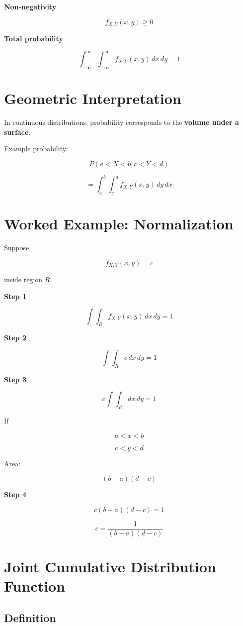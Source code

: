 \documentclass[12pt]{article}
\begin{document}
\textbf{Non-negativity}

\[
f_{X,Y}(x,y) \ge 0
\]

\textbf{Total probability}

\[
\int_{-\infty}^{\infty}\int_{-\infty}^{\infty} f_{X,Y}(x,y)\,dx\,dy = 1
\]

\section{Geometric Interpretation}

In continuous distributions, probability corresponds to the \textbf{volume under a surface}.

Example probability:

\[
P(a<X<b, c<Y<d)
\]

\[
=\int_a^b \int_c^d f_{X,Y}(x,y)\,dy\,dx
\]

\section{Worked Example: Normalization}

Suppose

\[
f_{X,Y}(x,y)=c
\]

inside region $R$.

\textbf{Step 1}

\[
\int\int_R f_{X,Y}(x,y)\,dx\,dy =1
\]

\textbf{Step 2}

\[
\int\int_R c\,dx\,dy =1
\]

\textbf{Step 3}

\[
c \int\int_R dx\,dy =1
\]

If

\[
a<x<b
\]

\[
c<y<d
\]

Area:

\[
(b-a)(d-c)
\]

\textbf{Step 4}

\[
c(b-a)(d-c)=1
\]

\[
c=\frac{1}{(b-a)(d-c)}
\]

\section{Joint Cumulative Distribution Function}

\subsection{Definition}
\end{document}
